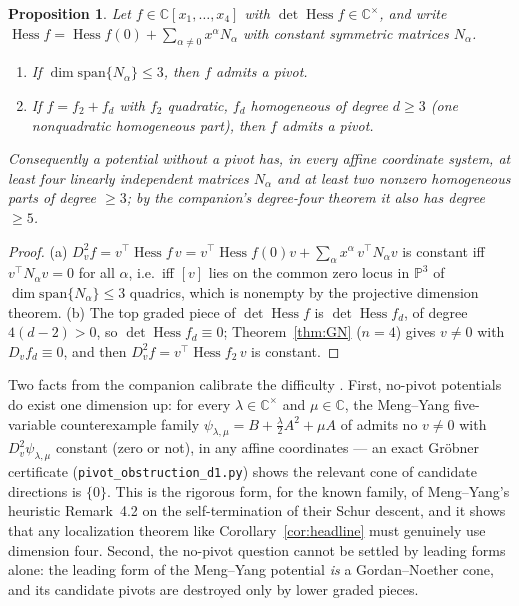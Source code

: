 \documentclass[11pt]{article}
\theoremstyle{plain}
\newtheorem{proposition}[theorem]{Proposition}
\theoremstyle{definition}
\newcommand{\C}{\mathbb{C}}
\newcommand{\Hess}{\operatorname{Hess}}
\begin{document}
\begin{proposition}\label{prop:pe}
Let $f\in\C[x_1,\dots,x_4]$ with $\det\Hess f\in\C^{\times}$, and write
$\Hess f=\Hess f(0)+\sum_{\alpha\ne0}x^\alpha N_\alpha$ with constant
symmetric matrices $N_\alpha$.
\begin{enumerate}
\item[\rm(a)] If $\dim\mathrm{span}\{N_\alpha\}\le3$, then $f$ admits a
pivot.
\item[\rm(b)] If $f=f_2+f_d$ with $f_2$ quadratic, $f_d$ homogeneous of
degree $d\ge3$ (one nonquadratic homogeneous part), then $f$ admits a
pivot.
\end{enumerate}
Consequently a potential without a pivot has, in every affine coordinate
system, at least four linearly independent matrices $N_\alpha$ and at
least two nonzero homogeneous parts of degree $\ge3$; by the companion's
degree-four theorem it also has degree $\ge5$.
\end{proposition}

\begin{proof}
(a) $D_v^2f=v^{\top}\Hess f\,v=v^{\top}\Hess f(0)v+\sum_\alpha x^\alpha\,
v^{\top}N_\alpha v$ is constant iff $v^{\top}N_\alpha v=0$ for all
$\alpha$, i.e.\ iff $[v]$ lies on the common zero locus in
$\mathbb{P}^3$ of $\dim\mathrm{span}\{N_\alpha\}\le3$ quadrics, which is
nonempty by the projective dimension theorem. (b) The top graded piece
of $\det\Hess f$ is $\det\Hess f_d$, of degree $4(d-2)>0$, so
$\det\Hess f_d\equiv0$; Theorem~\ref{thm:GN} ($n=4$) gives $v\ne0$ with
$D_vf_d\equiv0$, and then $D_v^2f=v^{\top}\Hess f_2\,v$ is constant.
\end{proof}

Two facts from the companion calibrate the difficulty
\cite{companion}. First, no-pivot potentials do exist one dimension up:
for every $\lambda\in\C^{\times}$ and $\mu\in\C$, the Meng--Yang
five-variable counterexample family
$\psi_{\lambda,\mu}=B+\tfrac{\lambda}{2}A^2+\mu A$ of \cite{MengYang}
admits no $v\ne0$ with $D_v^2\psi_{\lambda,\mu}$ constant (zero or not),
in any affine coordinates --- an exact Gr\"obner certificate
(\texttt{pivot\_obstruction\_d1.py}) shows the relevant cone of
candidate directions is $\{0\}$. This is the rigorous form, for the
known family, of Meng--Yang's heuristic Remark~4.2 on the
self-termination of their Schur descent, and it shows that any
localization theorem like Corollary~\ref{cor:headline} must genuinely
use dimension four. Second, the no-pivot question cannot be settled by
leading forms alone: the leading form of the Meng--Yang potential
\emph{is} a Gordan--Noether cone, and its candidate pivots are destroyed
only by lower graded pieces.
\end{document}
